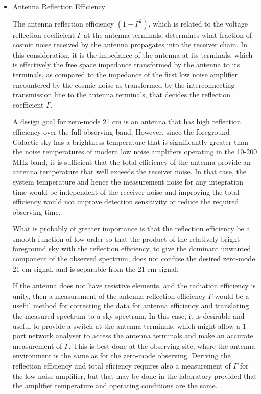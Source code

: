 \begin{itemize}
   \item
   Antenna Reflection Efficiency
   
   The antenna reflection efficiency $(1-\Gamma^2)$, which is related to the voltage reflection coefficient $\Gamma$ at the antenna terminals, determines what fraction of cosmic noise received by the antenna propagates into the receiver chain.  In this consideration, it is the impedance of the antenna at its terminals, which is effectively the free space impedance transformed by the antenna to its terminals, as compared to the impedance of the first low noise amplifier encountered by the cosmic noise as transformed by the interconnecting transmission line to the antenna terminals, that decides the reflection coefficient $\Gamma$.  
   
   A design goal for zero-mode 21 cm is an antenna that has high reflection efficiency over the full observing band.  However, since the foreground Galactic sky has a brightness temperature that is significantly greater than the noise temperatures of modern low noise amplifiers operating in the 10-200 MHz band, it is sufficient that the total efficiency of the antenna provide an antenna temperature that well exceeds the receiver noise.  In that case, the system temperature and hence the measurement noise for any integration time would be independent of the receiver noise and improving the total efficiency would not improve detection sensitivity or reduce the required observing time.
   
   What is probably of greater importance is that the reflection efficiency be a smooth function of low order so that the product of the relatively bright foreground sky with the reflection efficiency, to give the dominant unwanted component of the observed spectrum, does not confuse the desired zero-mode 21 cm signal, and is separable from the 21-cm signal.
   
   If the antenna does not have resistive elements, and the radiation efficiency is unity, then a measurement of the antenna reflection efficiency $\Gamma$ would be a useful method for correcting the data for antenna efficiency and translating the measured spectrum to a sky spectrum. In this case, it is desirable and useful to provide a switch at the antenna terminals, which might allow a 1-port network analyser to access the antenna terminals and make an accurate measurement of $\Gamma$.  This is best done at the observing site, where the antenna environment is the same as for the zero-mode observing.  Deriving the reflection efficiency and total eficiency requires also a measurement of $\Gamma$ for the low-noise amplifier, but that may be done in the laboratory provided that the amplifier temperature and operating conditions are the same.
   

\end{itemize}
